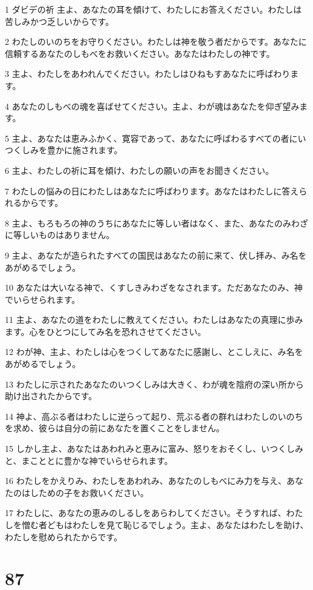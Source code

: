 \par 1 ダビデの祈 主よ、あなたの耳を傾けて、わたしにお答えください。わたしは苦しみかつ乏しいからです。
\par 2 わたしのいのちをお守りください。わたしは神を敬う者だからです。あなたに信頼するあなたのしもべをお救いください。あなたはわたしの神です。
\par 3 主よ、わたしをあわれんでください。わたしはひねもすあなたに呼ばわります。
\par 4 あなたのしもべの魂を喜ばせてください。主よ、わが魂はあなたを仰ぎ望みます。
\par 5 主よ、あなたは恵みふかく、寛容であって、あなたに呼ばわるすべての者にいつくしみを豊かに施されます。
\par 6 主よ、わたしの祈に耳を傾け、わたしの願いの声をお聞きください。
\par 7 わたしの悩みの日にわたしはあなたに呼ばわります。あなたはわたしに答えられるからです。
\par 8 主よ、もろもろの神のうちにあなたに等しい者はなく、また、あなたのみわざに等しいものはありません。
\par 9 主よ、あなたが造られたすべての国民はあなたの前に来て、伏し拝み、み名をあがめるでしょう。
\par 10 あなたは大いなる神で、くすしきみわざをなされます。ただあなたのみ、神でいらせられます。
\par 11 主よ、あなたの道をわたしに教えてください。わたしはあなたの真理に歩みます。心をひとつにしてみ名を恐れさせてください。
\par 12 わが神、主よ、わたしは心をつくしてあなたに感謝し、とこしえに、み名をあがめるでしょう。
\par 13 わたしに示されたあなたのいつくしみは大きく、わが魂を陰府の深い所から助け出されたからです。
\par 14 神よ、高ぶる者はわたしに逆らって起り、荒ぶる者の群れはわたしのいのちを求め、彼らは自分の前にあなたを置くことをしません。
\par 15 しかし主よ、あなたはあわれみと恵みに富み、怒りをおそくし、いつくしみと、まこととに豊かな神でいらせられます。
\par 16 わたしをかえりみ、わたしをあわれみ、あなたのしもべにみ力を与え、あなたのはしための子をお救いください。
\par 17 わたしに、あなたの恵みのしるしをあらわしてください。そうすれば、わたしを憎む者どもはわたしを見て恥じるでしょう。主よ、あなたはわたしを助け、わたしを慰められたからです。

\chapter{87}

